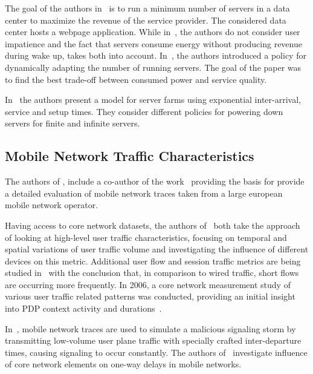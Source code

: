 The goal of the authors in~\cite{Mazzucco2010a, Dyachuk2010, Mazzucco2010b} is to run a minimum number of servers in a data center to maximize the revenue of the service provider.
The considered data center hosts a webpage application. While in~\cite{Mazzucco2010a}, the authors do not consider user impatience and the fact that servers consume energy without producing revenue during wake up, \cite{Mazzucco2010b} takes both into account. In~\cite{Dyachuk2010}, the authors introduced a policy for dynamically adapting the number of running servers. The goal of the paper was to find the best trade-off between consumed power and service quality.

In~\cite{Gandhi2010} the authors present a model for server farms using exponential inter-arrival, service and setup times. They consider different policies for powering down servers for finite and infinite servers. 


\subsection{Mobile Network Traffic Characteristics}
The authors of \cite{Metzger2014}, include a co-author of the work~\cite{Metzger2014a} providing the basis for  provide a detailed evaluation of mobile network traces taken from a large european mobile network operator. 

Having access to core network datasets, the authors of~\cite{Shafiq2011, Paul2011} both take the approach of looking at high-level user traffic characteristics, focusing on temporal and spatial variations of user traffic volume and investigating the influence of different devices on this metric.
Additional user flow and session traffic metrics are being studied in~\cite{Zhang2012} with the conclusion that, in comparison to wired traffic, short flows are occurring more frequently.
In 2006, a core network measurement study of various user traffic related patterns was conducted, providing an initial insight into \gls{PDP} context activity and durations~\cite{Svoboda2006}.

In~\cite{Lee2007}, mobile network traces are used to simulate a malicious signaling storm by transmitting low-volume user plane traffic with specially crafted inter-departure times, causing signaling to occur constantly.
The authors of~\cite{Romirer-Maierhofer2008} investigate influence of core network elements on one-way delays in mobile networks.

